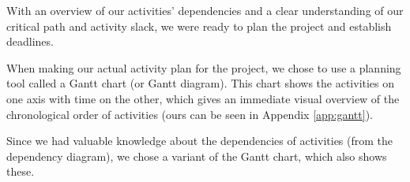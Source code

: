 With an overview of our activities’ dependencies and a clear understanding of our
critical path and activity slack, we were ready to plan the project and establish
deadlines.

When making our actual activity plan for the project, we chose to use a planning
tool called a Gantt chart (or Gantt diagram). This chart shows the
activities on one axis with time on the other, which gives an immediate visual
overview of the chronological order of activities (ours can be seen in Appendix
\ref{app:gantt}).

Since we had valuable knowledge about the dependencies of activities (from the
dependency diagram), we chose a variant of the Gantt chart, which also shows these.
